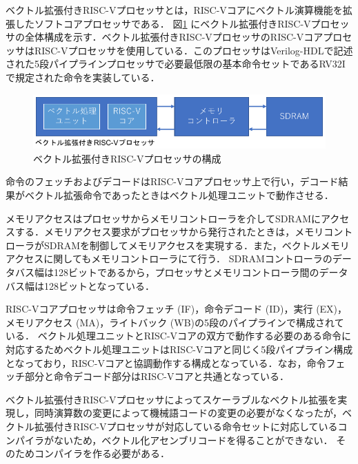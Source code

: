 ベクトル拡張付きRISC-Vプロセッサとは，RISC-Vコアにベクトル演算機能を拡張したソフトコアプロセッサである．
図\ref{fig:MIQS_system}
にベクトル拡張付きRISC-Vプロセッサの全体構成を示す．ベクトル拡張付きRISC-VプロセッサのRISC-VコアプロセッサはRISC-Vプロセッサを使用している．このプロセッサはVerilog-HDLで記述された5段パイプラインプロセッサで必要最低限の基本命令セットであるRV32Iで規定された命令を実装している．

\begin{figure}[b]
\begin{center}
    \includegraphics[scale=1.2]{image/MIQS_system.pdf}
    \caption{ベクトル拡張付きRISC-Vプロセッサの構成}
    \label{fig:MIQS_system}
\end{center}
\end{figure}

命令のフェッチおよびデコードはRISC-Vコアプロセッサ上で行い，デコード結果がベクトル拡張命令であったときはベクトル処理ユニットで動作させる．

メモリアクセスはプロセッサからメモリコントローラを介してSDRAMにアクセスする．メモリアクセス要求がプロセッサから発行されたときは，メモリコントローラがSDRAMを制御してメモリアクセスを実現する．また，ベクトルメモリアクセスに関してもメモリコントローラにて行う．
SDRAMコントローラのデータバス幅は128ビットであるから，プロセッサとメモリコントローラ間のデータバス幅は128ビットとなっている．

RISC-Vコアプロセッサは命令フェッチ (IF)，命令デコード (ID)，実行 (EX)，メモリアクセス (MA)，ライトバック (WB)の5段のパイプラインで構成されている．
ベクトル処理ユニットとRISC-Vコアの双方で動作する必要のある命令に対応するためベクトル処理ユニットはRISC-Vコアと同じく5段パイプライン構成となっており，RISC-Vコアと協調動作する構成となっている．なお，命令フェッチ部分と命令デコード部分はRISC-Vコアと共通となっている．

ベクトル拡張付きRISC-Vプロセッサによってスケーラブルなベクトル拡張を実現し，同時演算数の変更によって機械語コードの変更の必要がなくなったが，ベクトル拡張付きRISC-Vプロセッサが対応している命令セットに対応しているコンパイラがないため，ベクトル化アセンブリコードを得ることができない．
そのためコンパイラを作る必要がある．